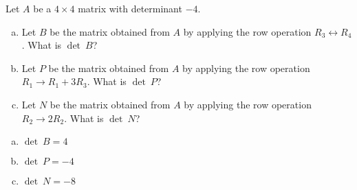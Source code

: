 
\begin{exerciseStatement}


Let \(A\) be a \(4 \times 4\) matrix with determinant \( -4 \).


\begin{enumerate}[(a)]
\item Let \(B\) be the matrix obtained from \(A\) by applying the row operation \( R_3 \leftrightarrow R_4 \). What is \(\operatorname{det}\ B\)?
\item Let \(P\) be the matrix obtained from \(A\) by applying the row operation \( R_1 \to R_1 + 3R_3 \). What is \(\operatorname{det}\ P\)?
\item Let \(N\) be the matrix obtained from \(A\) by applying the row operation \( R_2 \to 2R_2 \). What is \(\operatorname{det}\ N\)?
\end{enumerate}
    
\end{exerciseStatement}
    
\begin{exerciseAnswer} 

\begin{enumerate}[(a)]
\item \(\operatorname{det}\ B= 4 \)
\item \(\operatorname{det}\ P= -4 \)
\item \(\operatorname{det}\ N= -8 \)
\end{enumerate}
    
\end{exerciseAnswer}
    

